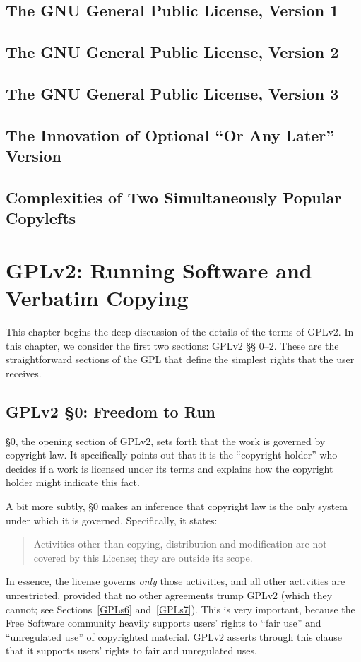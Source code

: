 \section{The GNU General Public License, Version 1}

\section{The GNU General Public License, Version 2}

\section{The GNU General Public License, Version 3}

\section{The Innovation of Optional ``Or Any Later'' Version}

\section{Complexities of Two Simultaneously Popular Copylefts}

\chapter{GPLv2: Running Software and Verbatim Copying}
\label{run-and-verbatim}


This chapter begins the deep discussion of the details of the terms of
GPLv2\@. In this chapter, we consider the first two sections: GPLv2 \S\S
0--2. These are the straightforward sections of the GPL that define the
simplest rights that the user receives.

\section{GPLv2 \S 0: Freedom to Run}
\label{GPLs0}

\S 0, the opening section of GPLv2, sets forth that the work is governed by
copyright law. It specifically points out that it is the ``copyright
holder'' who decides if a work is licensed under its terms and explains
how the copyright holder might indicate this fact.

A bit more subtly, \S 0 makes an inference that copyright law is the only
system under which it is governed. Specifically, it states:
\begin{quote}
Activities other than copying, distribution and modification are not
covered by this License; they are outside its scope.
\end{quote}
In essence, the license governs \emph{only} those activities, and all other
activities are unrestricted, provided that no other agreements trump GPLv2
(which they cannot; see Sections~\ref{GPLs6} and~\ref{GPLs7}). This is
very important, because the Free Software community heavily supports
users' rights to ``fair use'' and ``unregulated use'' of copyrighted
material. GPLv2 asserts through this clause that it supports users' rights
to fair and unregulated uses.

